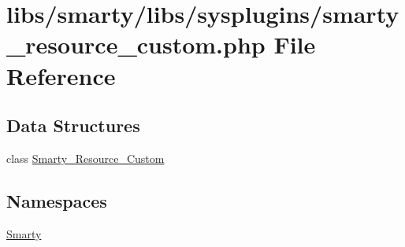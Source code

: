 \hypertarget{smarty__resource__custom_8php}{}\section{libs/smarty/libs/sysplugins/smarty\+\_\+resource\+\_\+custom.php File Reference}
\label{smarty__resource__custom_8php}
\subsection*{Data Structures}
\begin{DoxyCompactItemize}
\item 
class \hyperlink{class_smarty___resource___custom}{Smarty\+\_\+\+Resource\+\_\+\+Custom}
\end{DoxyCompactItemize}
\subsection*{Namespaces}
\begin{DoxyCompactItemize}
\item 
 \hyperlink{namespace_smarty}{Smarty}
\end{DoxyCompactItemize}
